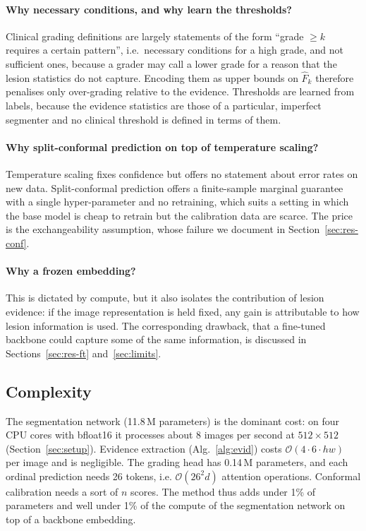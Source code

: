 \paragraph{Why necessary conditions, and why learn the thresholds?} Clinical grading definitions are largely statements of the form ``grade $\ge k$ requires a certain pattern'', i.e.\ necessary conditions for a high grade, and not sufficient ones, because a grader may call a lower grade for a reason that the lesion statistics do not capture. Encoding them as upper bounds on $\hat F_k$ therefore penalises only over-grading relative to the evidence. Thresholds are learned from labels, because the evidence statistics are those of a particular, imperfect segmenter and no clinical threshold is defined in terms of them.

\paragraph{Why split-conformal prediction on top of temperature scaling?} Temperature scaling fixes confidence but offers no statement about error rates on new data. Split-conformal prediction offers a finite-sample marginal guarantee with a single hyper-parameter and no retraining, which suits a setting in which the base model is cheap to retrain but the calibration data are scarce. The price is the exchangeability assumption, whose failure we document in Section~\ref{sec:res-conf}.

\paragraph{Why a frozen embedding?} This is dictated by compute, but it also isolates the contribution of lesion evidence: if the image representation is held fixed, any gain is attributable to how lesion information is used. The corresponding drawback, that a fine-tuned backbone could capture some of the same information, is discussed in Sections~\ref{sec:res-ft} and~\ref{sec:limits}.

\subsection{Complexity}
The segmentation network (11.8\,M parameters) is the dominant cost: on four CPU cores with bfloat16 it processes about 8 images per second at $512\times512$ (Section~\ref{sec:setup}). Evidence extraction (Alg.~\ref{alg:evid}) costs $\mathcal O(4\cdot6\cdot h w)$ per image and is negligible. The grading head has 0.14\,M parameters, and each ordinal prediction needs 26 tokens, i.e. $\mathcal O(26^2 d)$ attention operations. Conformal calibration needs a sort of $n$ scores. The method thus adds under 1\% of parameters and well under 1\% of the compute of the segmentation network on top of a backbone embedding.
